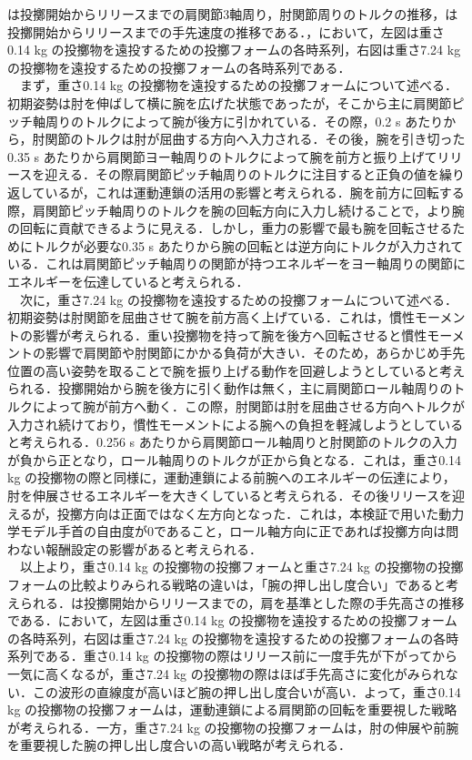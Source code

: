 は投擲開始からリリースまでの肩関節3軸周り，肘関節周りのトルクの推移，は投擲開始からリリースまでの手先速度の推移である．，において，左図は重さ0.14 kg の投擲物を遠投するための投擲フォームの各時系列，右図は重さ7.24 kg の投擲物を遠投するための投擲フォームの各時系列である．\\
　まず，重さ0.14 kg の投擲物を遠投するための投擲フォームについて述べる．初期姿勢は肘を伸ばして横に腕を広げた状態であったが，そこから主に肩関節ピッチ軸周りのトルクによって腕が後方に引かれている．その際，0.2 s あたりから，肘関節のトルクは肘が屈曲する方向へ入力される．その後，腕を引き切った0.35 s あたりから肩関節ヨー軸周りのトルクによって腕を前方と振り上げてリリースを迎える．その際肩関節ピッチ軸周りのトルクに注目すると正負の値を繰り返しているが，これは運動連鎖の活用の影響と考えられる．腕を前方に回転する際，肩関節ピッチ軸周りのトルクを腕の回転方向に入力し続けることで，より腕の回転に貢献できるように見える．しかし，重力の影響で最も腕を回転させるためにトルクが必要な0.35 s あたりから腕の回転とは逆方向にトルクが入力されている．これは肩関節ピッチ軸周りの関節が持つエネルギーをヨー軸周りの関節にエネルギーを伝達していると考えられる．\\
　次に，重さ7.24 kg の投擲物を遠投するための投擲フォームについて述べる．初期姿勢は肘関節を屈曲させて腕を前方高く上げている．これは，慣性モーメントの影響が考えられる．重い投擲物を持って腕を後方へ回転させると慣性モーメントの影響で肩関節や肘関節にかかる負荷が大きい．そのため，あらかじめ手先位置の高い姿勢を取ることで腕を振り上げる動作を回避しようとしていると考えられる．投擲開始から腕を後方に引く動作は無く，主に肩関節ロール軸周りのトルクによって腕が前方へ動く．この際，肘関節は肘を屈曲させる方向へトルクが入力され続けており，慣性モーメントによる腕への負担を軽減しようとしていると考えられる．0.256 s あたりから肩関節ロール軸周りと肘関節のトルクの入力が負から正となり，ロール軸周りのトルクが正から負となる．これは，重さ0.14 kg の投擲物の際と同様に，運動連鎖による前腕へのエネルギーの伝達により，肘を伸展させるエネルギーを大きくしていると考えられる．その後リリースを迎えるが，投擲方向は正面ではなく左方向となった．これは，本検証で用いた動力学モデル手首の自由度が0であること，ロール軸方向に正であれば投擲方向は問わない報酬設定の影響があると考えられる．\\
　以上より，重さ0.14 kg の投擲物の投擲フォームと重さ7.24 kg の投擲物の投擲フォームの比較よりみられる戦略の違いは，「腕の押し出し度合い」であると考えられる．は投擲開始からリリースまでの，肩を基準とした際の手先高さの推移である．において，左図は重さ0.14 kg の投擲物を遠投するための投擲フォームの各時系列，右図は重さ7.24 kg の投擲物を遠投するための投擲フォームの各時系列である．重さ0.14 kg の投擲物の際はリリース前に一度手先が下がってから一気に高くなるが，重さ7.24 kg の投擲物の際はほば手先高さに変化がみられない．この波形の直線度が高いほど腕の押し出し度合いが高い．よって，重さ0.14 kg の投擲物の投擲フォームは，運動連鎖による肩関節の回転を重要視した戦略が考えられる．一方，重さ7.24 kg の投擲物の投擲フォームは，肘の伸展や前腕を重要視した腕の押し出し度合いの高い戦略が考えられる．

